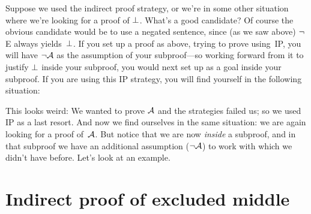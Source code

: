 Suppose we used the indirect proof strategy, or we're in some other situation where we're looking for a proof of $\bot$.  What's a good candidate? Of course the obvious candidate would be to use a negated sentence, since (as we saw above) $\neg$E always yields~$\bot$. If you set up a proof as above, trying to prove  using~IP, you will have $\neg \mathcal{A}$ as the assumption of your subproof---so working forward from it to justify $\bot$ inside your subproof, you would next set up  as a goal inside your subproof. If you are using this IP strategy, you will find yourself in the following situation: 
\begin{fitchproof}
\open
{}\AS
\ellipsesline
{}
\close
{}
\end{fitchproof} 
This looks weird: We wanted to prove $\mathcal{A}$ and the strategies failed us; so we used IP as a last resort. And now we find ourselves in the same situation: we are again looking for a proof of~$\mathcal{A}$. But notice that we are now \emph{inside} a subproof, and in that subproof we have an additional assumption ($\neg \mathcal{A}$) to work with which we didn't have before. Let's look at an example.

\section{Indirect proof of excluded middle}\label{s:proofLEM}

